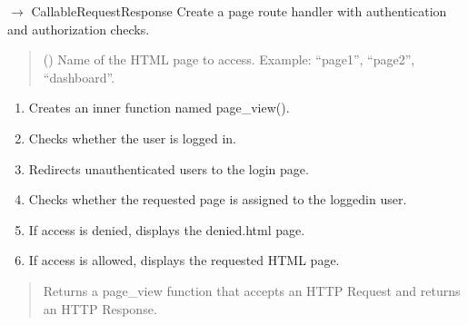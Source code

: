 \documentclass[letterpaper,10pt,english]{sphinxmanual}
\begin{document}

\begin{fulllineitems}
\label{\detokenize{modules:app.access.make_page_route}}
\pysigstartsignatures
\pysiglinewithargsret
{}
{}
{{ $\rightarrow$ Callable\DUrole{p}{{[}}\DUrole{p}{{[}}Request\DUrole{p}{{]}}Response\DUrole{p}{{]}}}}
\pysigstopsignatures
\sphinxAtStartPar
Create a page route handler with authentication
and authorization checks.
\begin{quote}\begin{description}
\sphinxAtStartPar
{} () \textendash{} Name of the HTML page to access.
Example: “page1”, “page2”, “dashboard”.

\end{description}\end{quote}
\begin{description}
\begin{enumerate}
%
\item {} 
\sphinxAtStartPar
Creates an inner function named page\_view().

\item {} 
\sphinxAtStartPar
Checks whether the user is logged in.

\item {} 
\sphinxAtStartPar
Redirects unauthenticated users to the login page.

\item {} 
\sphinxAtStartPar
Checks whether the requested page is assigned
to the logged\sphinxhyphen{}in user.

\item {} 
\sphinxAtStartPar
If access is denied, displays the denied.html page.

\item {} 
\sphinxAtStartPar
If access is allowed, displays the requested HTML page.

\end{enumerate}

\end{description}
\begin{quote}\begin{description}
\sphinxAtStartPar
Returns a page\_view function that accepts an HTTP
Request and returns an HTTP Response.


\end{description}
\end{quote}
\end{fulllineitems}
\end{document}
